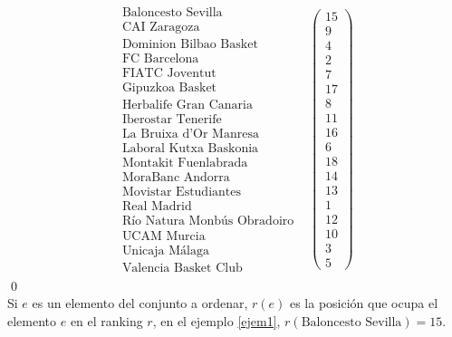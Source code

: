 \[
\begin{array}{ccc}
\begin{array}{c}
\text{Baloncesto Sevilla}\\
\text{CAI Zaragoza} \\
\text{Dominion Bilbao Basket} \\
\text{FC Barcelona} \\
\text{FIATC Joventut} \\
\text{Gipuzkoa Basket} \\
\text{Herbalife Gran Canaria} \\
\text{Iberostar Tenerife} \\
\text{La Bruixa d'Or Manresa} \\
\text{Laboral Kutxa Baskonia} \\
\text{Montakit Fuenlabrada} \\
\text{MoraBanc Andorra} \\
\text{Movistar Estudiantes} \\
\text{Real Madrid} \\
\text{Río Natura Monbús Obradoiro} \\
\text{UCAM Murcia} \\
\text{Unicaja Málaga} \\
\text{Valencia Basket Club}

\end{array} & \left(\begin{array}{c}
15\\
9\\
4\\
2\\
7\\
17\\
8\\
11\\
16\\
6\\
18\\
14\\
13\\
1\\
12\\
10\\
3\\
5
\end{array} \right)
\end{array}  
\]
\qed
\ \\

Si $e$ es un elemento del conjunto a ordenar, $r(e)$ es la posición que ocupa el elemento $e$ en el ranking $r$, en el ejemplo \ref{ejem1}, $r(\text{Baloncesto Sevilla}) = 15$.

